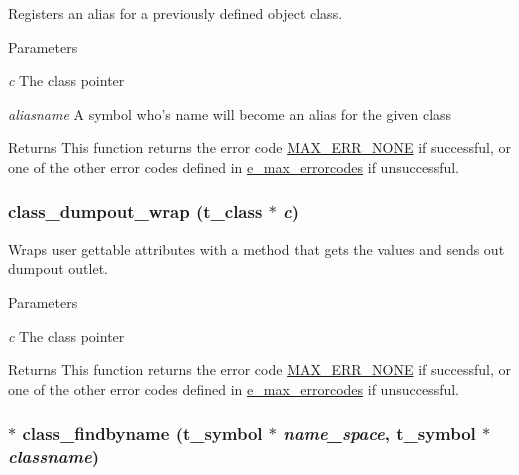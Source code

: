 Registers an alias for a previously defined object class. 
\begin{DoxyParams}{Parameters}
\item[{\em c}]The class pointer \item[{\em aliasname}]A symbol who's name will become an alias for the given class\end{DoxyParams}
\begin{DoxyReturn}{Returns}
This function returns the error code \hyperlink{group__misc_gga0764dd6c02b76cca7d053ae50555d69da6d22f77fef8b1e1b074cef5d29d935fd}{MAX\_\-ERR\_\-NONE} if successful, or one of the other error codes defined in \hyperlink{group__misc_ga0764dd6c02b76cca7d053ae50555d69d}{e\_\-max\_\-errorcodes} if unsuccessful. 
\end{DoxyReturn}
\hypertarget{group__class_ga1b3d0a6942c49af47e3f44031d8f1097}{
\subsubsection[{class\_\-dumpout\_\-wrap}]{ class\_\-dumpout\_\-wrap ({\bf t\_\-class} $\ast$ {\em c})}}
\label{group__class_ga1b3d0a6942c49af47e3f44031d8f1097}


Wraps user gettable attributes with a method that gets the values and sends out dumpout outlet. 
\begin{DoxyParams}{Parameters}
\item[{\em c}]The class pointer \end{DoxyParams}
\begin{DoxyReturn}{Returns}
This function returns the error code \hyperlink{group__misc_gga0764dd6c02b76cca7d053ae50555d69da6d22f77fef8b1e1b074cef5d29d935fd}{MAX\_\-ERR\_\-NONE} if successful, or one of the other error codes defined in \hyperlink{group__misc_ga0764dd6c02b76cca7d053ae50555d69d}{e\_\-max\_\-errorcodes} if unsuccessful. 
\end{DoxyReturn}
\hypertarget{group__class_ga11d93886daa53a3e0dea974176190301}{
\subsubsection[{class\_\-findbyname}]{$\ast$ class\_\-findbyname ({\bf t\_\-symbol} $\ast$ {\em name\_\-space}, \/  {\bf t\_\-symbol} $\ast$ {\em classname})}}
\label{group__class_ga11d93886daa53a3e0dea974176190301}


